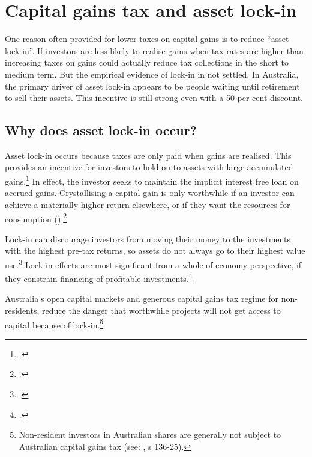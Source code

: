 \documentclass{grattanAlpha}\usepackage[]{graphicx}\usepackage[]{color}
\begin{document}
\clearpage
%


\printbibliography[title=References]



\appendix
\chapter{Capital gains tax and asset lock-in}\label{appendix:CGT-asset-lock-in}
One reason often provided for lower taxes on capital gains is to reduce ``asset lock-in''. If investors are less likely to realise gains when tax rates are higher than increasing taxes on gains could actually reduce tax collections in the short to medium term. But the empirical evidence of lock-in in not settled. In Australia, the primary driver of asset lock-in appears to be people waiting until retirement to sell their assets. This incentive is still strong even with a 50 per cent discount. 

\section{Why does asset lock-in occur?}
Asset lock-in occurs because taxes are only paid when gains are realised. This provides an incentive for investors to hold on to assets with large accumulated gains.\footcite{Burman2009}  In effect, the investor seeks to maintain the implicit interest free loan on accrued gains. Crystallising a capital gain is only worthwhile if an investor can achieve a materially higher return elsewhere, or if they want the resources for consumption ().\footcite[][12]{Ingles2009a}   

Lock-in can discourage investors from moving their money to the investments with the highest pre-tax returns, so assets do not always go to their highest value use.\footcite{Lindsey1987}  Lock-in effects are most significant from a whole of economy perspective, if they constrain financing of profitable investments.\footcites{OECD2006TaxationOfCapitalGains}{Johnson2008}  


Australia’s open capital markets and generous capital gains tax regime for non-residents, reduce the danger that worthwhile projects will not get access to capital because of lock-in.\footnote{Non-resident investors in Australian shares are generally not subject to Australian capital gains tax (see: , s 136-25). } 
\end{document}
